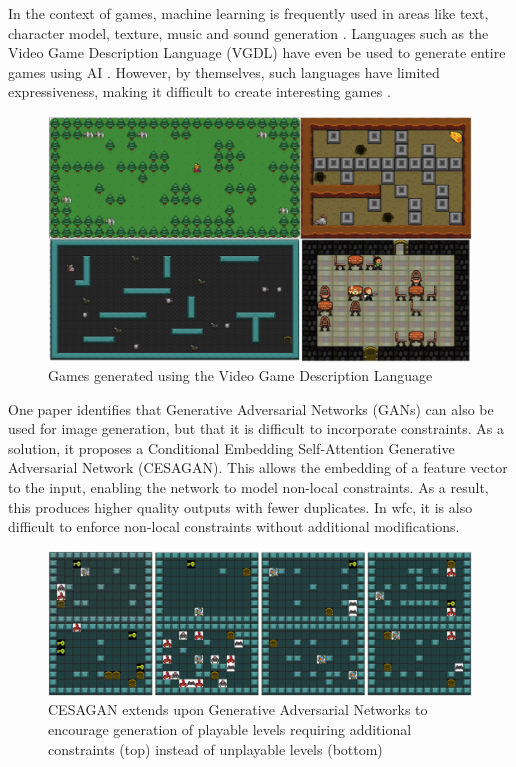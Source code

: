 In the context of games, machine learning is frequently used in areas like text, character model, texture, music and sound generation \cite{DeepLearningPCG}. Languages such as the Video Game Description Language (VGDL) have even be used to generate entire games using AI \cite{VGDL, VGDL_ASP}. However, by themselves, such languages have limited expressiveness, making it difficult to create interesting games \cite{VGDL}.

\begin{figure}[H]
    \centering
    \includegraphics[width=\textwidth, height=0.3\textheight, keepaspectratio]{Images/VGDL.jpg}
    \caption{Games generated using the Video Game Description Language \cite{VGDL}}
    \label{fig:vgdl}
\end{figure}

One paper \cite{CESAGAN} identifies that Generative Adversarial Networks (GANs) can also be used for image generation, but that it is difficult to incorporate constraints. As a solution, it proposes a Conditional Embedding Self-Attention Generative Adversarial Network (CESAGAN). This allows the embedding of a feature vector to the input, enabling the network to model non-local constraints. As a result, this produces higher quality outputs with fewer duplicates. In \acrshort{wfc}, it is also difficult to enforce non-local constraints without additional modifications.

\begin{figure}[H]
    \centering
    \includegraphics[width=\textwidth, height=0.3\textheight, keepaspectratio]{Images/CESAGAN.jpg}
    \caption{CESAGAN extends upon Generative Adversarial Networks to encourage generation of playable levels requiring additional constraints (top) instead of unplayable levels (bottom) \cite{CESAGAN}}
    \label{fig:cesagan}
\end{figure}

